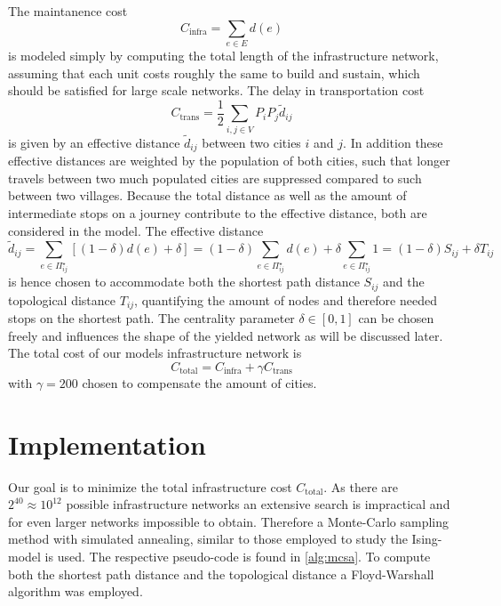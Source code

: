 \documentclass[aps,pra,showpacs,preprintnumbers,amsmath,amssymb,footinbib]{revtex4-2}
\begin{document}
    The maintanence cost \[C_{\mathrm{infra}} = \sum_{e \in E}{d(e)}\] is modeled simply by computing the total length of the infrastructure network, assuming that each unit costs roughly the same to build and sustain, which should be satisfied for large scale networks. 
    The delay in transportation cost \[C_{\mathrm{trans}} = \frac{1}{2} \sum_{i, j \in V} P_i P_j \tilde{d}_{ij}\] is given by an effective distance $\tilde{d}_{ij}$ between two cities $i$ and $j$.
    In addition these effective distances are weighted by the population of both cities, such that longer travels between two much populated cities are suppressed compared to such between two villages.
    Because the total distance as well as the amount of intermediate stops on a journey contribute to the effective distance, both are considered in the model.
    The effective distance \[\tilde{d}_{ij} = \sum_{e \in \Pi^\star_{ij}} [(1 - \delta) d(e) + \delta] = (1 - \delta) \sum_{e \in \Pi^\star_{ij}} d(e) + \delta \sum_{e \in \Pi^\star_{ij}} 1 = (1 - \delta) S_{ij} + \delta T_{ij}\] is hence chosen to accommodate both the shortest path distance $S_{ij}$ and the topological distance $T_{ij}$, quantifying the amount of nodes and therefore needed stops on the shortest path.
    The centrality parameter $\delta \in [0, 1]$ can be chosen freely and influences the shape of the yielded network as will be discussed later.
    The total cost of our models infrastructure network is \[C_{\mathrm{total}} = C_{\mathrm{infra}} + \gamma C_{\mathrm{trans}}\] with $\gamma = 200$ chosen to compensate the amount of cities. 

    \section{Implementation}

    Our goal is to minimize the total infrastructure cost $C_{\mathrm{total}}$. 
    As there are $2^{40} \approx 10^{12}$ possible infrastructure networks an extensive search is impractical and for even larger networks impossible to obtain.
    Therefore a Monte-Carlo sampling method with simulated annealing, similar to those employed to study the Ising-model is used.
    The respective pseudo-code is found in \cref{alg:mcsa}.
    To compute both the shortest path distance and the topological distance a Floyd-Warshall algorithm was employed.
\end{document}
